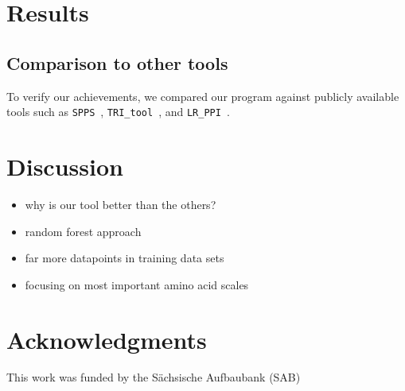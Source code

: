 \documentclass[preprint,3p,times,twocolumn]{elsarticle}
\newcommand{\spps}{\texttt{SPPS}}
\newcommand{\tri}{\texttt{TRI\_tool}}
\newcommand{\lr}{\texttt{LR\_PPI}}
\begin{document}

\section{Results}
%

\subsection{Comparison to other tools}
To verify our achievements, we compared our program against publicly available tools such as \spps\ \cite{Liu:2012}, \tri\ \cite{Perovic:2017}, and \lr\ \cite{Pan:2010}.

\section{Discussion}
\begin{itemize}
\item why is our tool better than the others?
\item random forest approach
\item far more datapoints in training data sets
\item focusing on most important amino acid scales
\end{itemize}


\section*{Acknowledgments}

This work was funded by the S\"achsische Aufbaubank (SAB)



\end{document}
